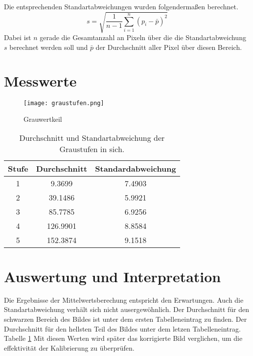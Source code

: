 Die entsprechenden Standartabweichungen wurden folgendermaßen berechnet.
\begin{equation}
s = \sqrt{\frac{1}{n-1}\sum_{i=1}^{n} (p_i- \bar{p})^2}
\end{equation}
Dabei ist $n$ gerade die Gesamtanzahl an Pixeln über die die Standartabweichung $s$ berechnet werden soll und $\bar{p}$ der Durchschnitt aller Pixel über diesen Bereich.

\section{Messwerte}
\label{chap:VERSUCH_1_MESSWERTE}
\begin{figure}[H]
\centering
\texttt{[image: graustufen.png]}
\caption{Grauwertkeil}
\label{img:Grauwertkeil}
\end{figure}
\begin{table}
\centering
\begin{tabular}{c|cc}
Stufe & Durchschnitt & Standardabweichung \\
\hline
1 & 9.3699 & 7.4903 \\
2 & 39.1486 & 5.9921 \\
3 & 85.7785 & 6.9256 \\
4 & 126.9901 & 8.8584 \\
5 & 152.3874 & 9.1518 \\
\end{tabular}
\caption{Durchschnitt und Standartabweichung der Graustufen in sich.}
\label{tab:GrauStufen_Mean}
\end{table}
\section{Auswertung und Interpretation}
\label{chap:VERSUCH_1_AUSWERTUNG}
Die Ergebnisse der Mittelwertsberechung entspricht den Erwartungen. Auch die Standartabweichung verhält sich nicht ausergewöhnlich.
Der Durchschnitt für den schwarzen Bereich des Bildes ist unter dem ersten Tabelleneintrag zu finden. Der Durchschnitt für den hellsten Teil des Bildes unter dem letzen Tabelleneintrag. Tabelle \ref{tab:GrauStufen_Mean} Mit diesen Werten wird später das korrigierte Bild verglichen, um die effektivität der Kalibrierung zu überprüfen.
